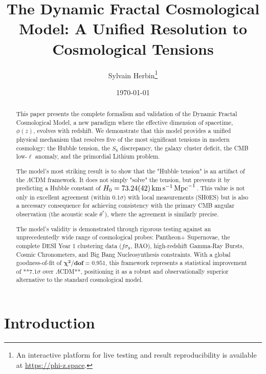 \documentclass[aps,prl,twocolumn,groupedaddress]{revtex4-2}
\newcommand{\optHnotval}{73.24}
\newcommand{\optHnoterr}{0.42}
\newcommand{\optHnot}{\SI{\optHnotval \pm \optHnoterr}{km.s^{-1}.Mpc^{-1}}}
\newcommand{\chiSqDofTotal}{0.951}
\begin{document}
\title{The Dynamic Fractal Cosmological Model: A Unified Resolution to Cosmological Tensions}
\author{Sylvain Herbin\footnote{An interactive platform for live testing and result reproducibility is available at \url{https://phi-z.space}.}}
\date{\today}

\begin{abstract}
This paper presents the complete formalism and validation of the Dynamic Fractal Cosmological Model, a new paradigm where the effective dimension of spacetime, $\phi(z)$, evolves with redshift. We demonstrate that this model provides a unified physical mechanism that resolves five of the most significant tensions in modern cosmology: the Hubble tension, the $S_8$ discrepancy, the galaxy cluster deficit, the CMB low-$\ell$ anomaly, and the primordial Lithium problem.

The model's most striking result is to show that the "Hubble tension" is an artifact of the $\Lambda$CDM framework. It does not simply "solve" the tension, but prevents it by predicting a Hubble constant of $H_0 = \optHnot$. This value is not only in excellent agreement (within $0.1\sigma$) with local measurements (SH0ES) but is also a necessary consequence for achieving consistency with the primary CMB angular observation (the acoustic scale $\theta^*$), where the agreement is similarly precise.

The model's validity is demonstrated through rigorous testing against an unprecedentedly wide range of cosmological probes: Pantheon+ Supernovae, the complete DESI Year 1 clustering data ($f\sigma_8$, BAO), high-redshift Gamma-Ray Bursts, Cosmic Chronometers, and Big Bang Nucleosynthesis constraints. With a global goodness-of-fit of $\mathbf{\chi^2/\text{dof} = \chiSqDofTotal}$, this framework represents a statistical improvement of **7.1$\sigma$ over $\Lambda$CDM**, positioning it as a robust and observationally superior alternative to the standard cosmological model.
\end{abstract}

\maketitle

\section{Introduction}
\end{document}
